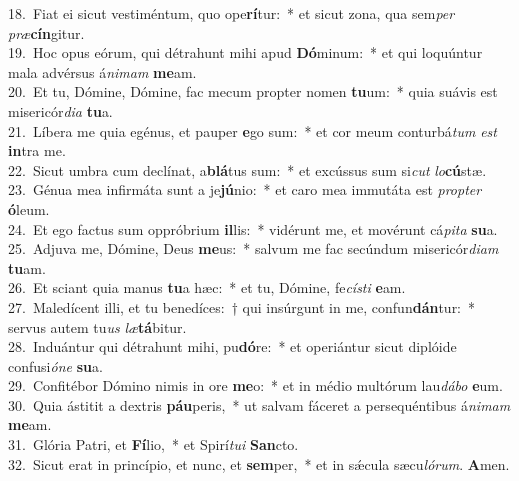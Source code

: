 {18.~}Fiat ei sicut vestiméntum, quo ope\textbf{rí}tur:~* et sicut zona, qua sem\textit{per} \textit{præ}\textbf{cín}gitur.\\
{19.~}Hoc opus eórum, qui détrahunt mihi apud \textbf{Dó}minum:~* et qui loquúntur mala advérsus á\textit{ni}\textit{mam} \textbf{me}am.\\
{20.~}Et tu, Dómine, Dómine, fac mecum propter nomen \textbf{tu}um:~* quia suávis est misericór\textit{di}\textit{a} \textbf{tu}a.\\
{21.~}Líbera me quia egénus, et pauper \textbf{e}go sum:~* et cor meum conturbá\textit{tum} \textit{est} \textbf{in}tra me.\\
{22.~}Sicut umbra cum declínat, a\textbf{blá}tus sum:~* et excússus sum si\textit{cut} \textit{lo}\textbf{cú}stæ.\\
{23.~}Génua mea infirmáta sunt a je\textbf{jú}nio:~* et caro mea immutáta est \textit{prop}\textit{ter} \textbf{ó}leum.\\
{24.~}Et ego factus sum oppróbrium \textbf{il}lis:~* vidérunt me, et movérunt cá\textit{pi}\textit{ta} \textbf{su}a.\\
{25.~}Adjuva me, Dómine, Deus \textbf{me}us:~* salvum me fac secúndum misericór\textit{di}\textit{am} \textbf{tu}am.\\
{26.~}Et sciant quia manus \textbf{tu}a hæc:~* et tu, Dómine, fe\textit{cí}\textit{sti} \textbf{e}am.\\
{27.~}Maledícent illi, et tu benedíces:~† qui insúrgunt in me, confun\textbf{dán}tur:~* servus autem tu\textit{us} \textit{læ}\textbf{tá}bitur.\\
{28.~}Induántur qui détrahunt mihi, pu\textbf{dó}re:~* et operiántur sicut diplóide confusi\textit{ó}\textit{ne} \textbf{su}a.\\
{29.~}Confitébor Dómino nimis in ore \textbf{me}o:~* et in médio multórum lau\textit{dá}\textit{bo} \textbf{e}um.\\
{30.~}Quia ástitit a dextris \textbf{páu}peris,~* ut salvam fáceret a persequéntibus á\textit{ni}\textit{mam} \textbf{me}am.\\
{31.~}Glória Patri, et \textbf{Fí}lio,~* et Spirí\textit{tu}\textit{i} \textbf{San}cto.\\
{32.~}Sicut erat in princípio, et nunc, et \textbf{sem}per,~* et in sǽcula sæcu\textit{ló}\textit{rum}. \textbf{A}men.\\
